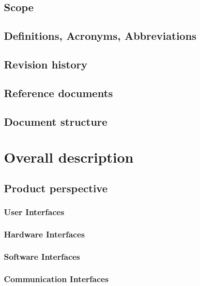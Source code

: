 \documentclass[a4paper,oneside,11pt]{article}
\begin{document}
        \subsection{Scope}
            
        \subsection{Definitions, Acronyms, Abbreviations}
            
        \subsection{Revision history}
        \subsection{Reference documents}
            
        \subsection{Document structure}
        
        
        
    \section{Overall description}
        \subsection{Product perspective}
            
            \subsubsection{User Interfaces}
                
            \subsubsection{Hardware Interfaces}
                
            \subsubsection{Software Interfaces}
                
            \subsubsection{Communication Interfaces}
                
\end{document}
